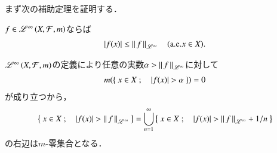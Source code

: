 まず次の補助定理を証明する．
\begin{itembox}[l]{}
	\begin{lem}
		$f \in \mathscr{L}^{\infty} \left(X,\mathcal{F},m\right)$ならば
		\begin{align}
			|f(x)| \leq \left\|\, f\, \right\|_{\mathscr{L}^\infty} \quad (\mathrm{a.e.}x \in X).
		\end{align}
		\label{lem:holder_inequality}
	\end{lem}
\end{itembox}
\begin{prf}
	$\mathscr{L}^{\infty} \left(X,\mathcal{F},m\right)$の定義により任意の実数$\alpha > \left\|\, f\, \right\|_{\mathscr{L}^\infty}$に対して
	\begin{align}
		m(\left\{\ x \in X\ ;\quad |f(x)| > \alpha\ \right\}) = 0
	\end{align}
	が成り立つから，
	\begin{align}
		\left\{\ x \in X\ ;\quad |f(x)| > \left\|\, f\, \right\|_{\mathscr{L}^\infty}\ \right\} = \bigcup_{n =1}^{\infty} \left\{\ x \in X\ ;\quad |f(x)| > \left\|\, f\, \right\|_{\mathscr{L}^\infty} + 1/n\ \right\}
	\end{align}
	の右辺は$m$-零集合となる．
	\QED
\end{prf}
